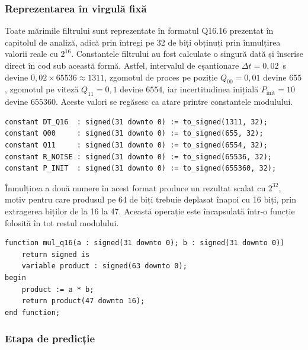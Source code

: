 \subsubsection{Reprezentarea în virgulă fixă}

Toate mărimile filtrului sunt reprezentate în formatul Q16.16 prezentat în capitolul
de analiză, adică prin întregi pe 32 de biți obținuți prin înmulțirea valorii reale
cu $2^{16}$. Constantele filtrului au fost calculate o singură dată și înscrise direct
în cod sub această formă. Astfel, intervalul de eșantionare $\Delta t = 0{,}02$~s
devine $0{,}02 \times 65536 \approx 1311$, zgomotul de proces pe poziție
$Q_{00} = 0{,}01$ devine $655$, zgomotul pe viteză $Q_{11} = 0{,}1$ devine $6554$, iar
incertitudinea inițială $P_\text{init} = 10$ devine $655360$. Aceste valori se
regăsesc ca atare printre constantele modulului.

\begin{lstlisting}[caption={Constantele filtrului, în format Q16.16.},label={lst:kalman-const}]
constant DT_Q16  : signed(31 downto 0) := to_signed(1311, 32);
constant Q00     : signed(31 downto 0) := to_signed(655, 32);
constant Q11     : signed(31 downto 0) := to_signed(6554, 32);
constant R_NOISE : signed(31 downto 0) := to_signed(65536, 32);
constant P_INIT  : signed(31 downto 0) := to_signed(655360, 32);
\end{lstlisting}

Înmulțirea a două numere în acest format produce un rezultat scalat cu $2^{32}$, motiv
pentru care produsul pe 64 de biți trebuie deplasat înapoi cu 16 biți, prin extragerea
biților de la 16 la 47. Această operație este încapsulată într-o funcție folosită în
tot restul modulului.

\begin{lstlisting}[caption={Funcția de înmulțire în virgulă fixă Q16.16.},label={lst:mulq16}]
function mul_q16(a : signed(31 downto 0); b : signed(31 downto 0))
    return signed is
    variable product : signed(63 downto 0);
begin
    product := a * b;
    return product(47 downto 16);
end function;
\end{lstlisting}

\subsubsection{Etapa de predicție}

